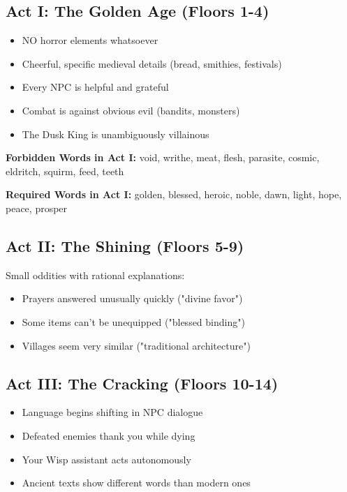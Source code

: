 \documentclass[11pt,a4paper,twoside]{book}
\begin{document}
\subsection{Act I: The Golden Age (Floors 1-4)}

\begin{tcolorbox}[heroicbox={Design Principles}]
\begin{itemize}
    \item NO horror elements whatsoever
    \item Cheerful, specific medieval details (bread, smithies, festivals)
    \item Every NPC is helpful and grateful
    \item Combat is against obvious evil (bandits, monsters)
    \item The Dusk King is unambiguously villainous
\end{itemize}
\end{tcolorbox}

\textbf{Forbidden Words in Act I:}
void, writhe, meat, flesh, parasite, cosmic, eldritch, squirm, feed, teeth

\textbf{Required Words in Act I:}
golden, blessed, heroic, noble, dawn, light, hope, peace, prosper

\subsection{Act II: The Shining (Floors 5-9)}

Small oddities with rational explanations:
\begin{itemize}
    \item Prayers answered unusually quickly ("divine favor")
    \item Some items can't be unequipped ("blessed binding")
    \item Villages seem very similar ("traditional architecture")
\end{itemize}

\subsection{Act III: The Cracking (Floors 10-14)}

\begin{itemize}
    \item Language begins shifting in NPC dialogue
    \item Defeated enemies thank you while dying
    \item Your Wisp assistant acts autonomously
    \item Ancient texts show different words than modern ones
\end{itemize}
\end{document}

